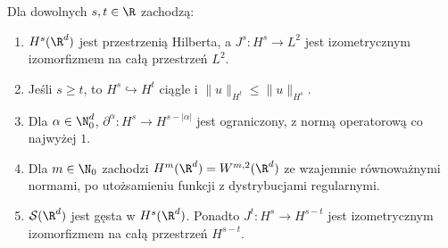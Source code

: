 \begin{twierdzenie}
\label{thm:dt-Hs}
Dla dowolnych $s,t\in\R$ zachodzą:
\begin{enumerate}
\item $H^s(\R^d)$ jest przestrzenią Hilberta, a
 $J^s:H^s\to L^2$ jest izometrycznym izomorfizmem
 na całą przestrzeń $L^2$.
\item Jeśli $s\ge t$, to $H^s\hookrightarrow H^t$
 ciągle i $\|u\|_{H^t}\le\|u\|_{H^s}$.
\item Dla $\alpha\in\N_0^d$, $\partial^\alpha:H^s\to
 H^{s-|\alpha|}$ jest ograniczony, z normą
 operatorową co najwyżej $1$.
\item Dla $m\in\N_0$ zachodzi $H^m(\R^d)=W^{m,2}(\R^d)$
 ze wzajemnie równoważnymi normami, po utożsamieniu
 funkcji z dystrybucjami regularnymi.
\item $\mathcal S(\R^d)$ jest gęsta w $H^s(\R^d)$.
 Ponadto $J^t:H^s\to H^{s-t}$ jest izometrycznym
 izomorfizmem na całą przestrzeń $H^{s-t}$.
\end{enumerate}
\end{twierdzenie}

